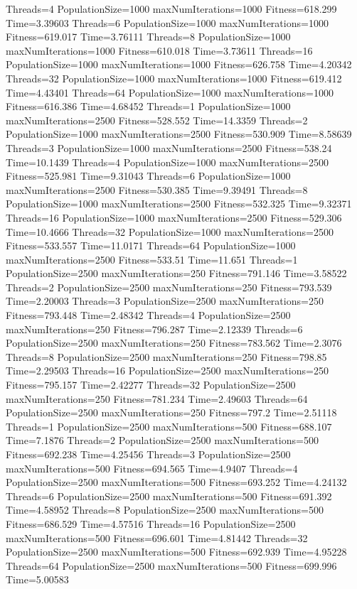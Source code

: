 \documentclass[10pt,letterpaper]{article}
\begin{document}
Threads=4 PopulationSize=1000 maxNumIterations=1000 Fitness=618.299 Time=3.39603
Threads=6 PopulationSize=1000 maxNumIterations=1000 Fitness=619.017 Time=3.76111
Threads=8 PopulationSize=1000 maxNumIterations=1000 Fitness=610.018 Time=3.73611
Threads=16 PopulationSize=1000 maxNumIterations=1000 Fitness=626.758 Time=4.20342
Threads=32 PopulationSize=1000 maxNumIterations=1000 Fitness=619.412 Time=4.43401
Threads=64 PopulationSize=1000 maxNumIterations=1000 Fitness=616.386 Time=4.68452
Threads=1 PopulationSize=1000 maxNumIterations=2500 Fitness=528.552 Time=14.3359
Threads=2 PopulationSize=1000 maxNumIterations=2500 Fitness=530.909 Time=8.58639
Threads=3 PopulationSize=1000 maxNumIterations=2500 Fitness=538.24 Time=10.1439
Threads=4 PopulationSize=1000 maxNumIterations=2500 Fitness=525.981 Time=9.31043
Threads=6 PopulationSize=1000 maxNumIterations=2500 Fitness=530.385 Time=9.39491
Threads=8 PopulationSize=1000 maxNumIterations=2500 Fitness=532.325 Time=9.32371
Threads=16 PopulationSize=1000 maxNumIterations=2500 Fitness=529.306 Time=10.4666
Threads=32 PopulationSize=1000 maxNumIterations=2500 Fitness=533.557 Time=11.0171
Threads=64 PopulationSize=1000 maxNumIterations=2500 Fitness=533.51 Time=11.651
Threads=1 PopulationSize=2500 maxNumIterations=250 Fitness=791.146 Time=3.58522
Threads=2 PopulationSize=2500 maxNumIterations=250 Fitness=793.539 Time=2.20003
Threads=3 PopulationSize=2500 maxNumIterations=250 Fitness=793.448 Time=2.48342
Threads=4 PopulationSize=2500 maxNumIterations=250 Fitness=796.287 Time=2.12339
Threads=6 PopulationSize=2500 maxNumIterations=250 Fitness=783.562 Time=2.3076
Threads=8 PopulationSize=2500 maxNumIterations=250 Fitness=798.85 Time=2.29503
Threads=16 PopulationSize=2500 maxNumIterations=250 Fitness=795.157 Time=2.42277
Threads=32 PopulationSize=2500 maxNumIterations=250 Fitness=781.234 Time=2.49603
Threads=64 PopulationSize=2500 maxNumIterations=250 Fitness=797.2 Time=2.51118
Threads=1 PopulationSize=2500 maxNumIterations=500 Fitness=688.107 Time=7.1876
Threads=2 PopulationSize=2500 maxNumIterations=500 Fitness=692.238 Time=4.25456
Threads=3 PopulationSize=2500 maxNumIterations=500 Fitness=694.565 Time=4.9407
Threads=4 PopulationSize=2500 maxNumIterations=500 Fitness=693.252 Time=4.24132
Threads=6 PopulationSize=2500 maxNumIterations=500 Fitness=691.392 Time=4.58952
Threads=8 PopulationSize=2500 maxNumIterations=500 Fitness=686.529 Time=4.57516
Threads=16 PopulationSize=2500 maxNumIterations=500 Fitness=696.601 Time=4.81442
Threads=32 PopulationSize=2500 maxNumIterations=500 Fitness=692.939 Time=4.95228
Threads=64 PopulationSize=2500 maxNumIterations=500 Fitness=699.996 Time=5.00583
\end{document}
